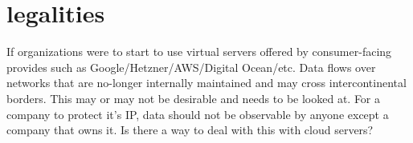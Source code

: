 \section{legalities}
If organizations were to start to use virtual servers offered by consumer-facing provides such as Google/Hetzner/AWS/Digital Ocean/etc. Data flows over networks that are no-longer internally maintained and may cross intercontinental borders. This may or may not be desirable and needs to be looked at. For a company to protect it's IP, data should not be observable by anyone except a company that owns it. Is there a way to deal with this with cloud servers?